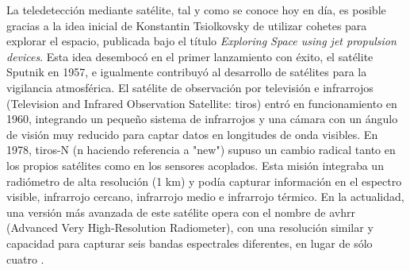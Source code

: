 La teledetección mediante satélite, tal y como se conoce hoy en día, es posible gracias a la idea inicial de Konstantin Tsiolkovsky de utilizar cohetes para explorar el espacio, publicada bajo el título \textit{Exploring Space using jet propulsion devices}. Esta idea desembocó en el primer lanzamiento con éxito, el satélite Sputnik en 1957, e igualmente contribuyó al desarrollo de satélites para la vigilancia atmosférica. El satélite de observación por televisión e infrarrojos (Television and Infrared Observation Satellite: \acrshort{tiros}) entró en funcionamiento en 1960, integrando un pequeño sistema de infrarrojos y una cámara con un ángulo de visión muy reducido para captar datos en longitudes de onda visibles. En 1978, \acrshort{tiros}-N (n haciendo referencia a "new") supuso un cambio radical tanto en los propios satélites como en los sensores acoplados. Esta misión integraba un radiómetro de alta resolución (1 \si{\kilo\meter}) y podía capturar información en el espectro visible, infrarrojo cercano, infrarrojo medio e infrarrojo térmico. En la actualidad, una versión más avanzada de este satélite opera con el nombre de \acrshort{avhrr} (Advanced Very High-Resolution Radiometer), con una resolución similar y capacidad para capturar seis bandas espectrales diferentes, en lugar de sólo cuatro \cite{national_oceanic_and_atmospheric_administration_avhrr3_nodate}.   

